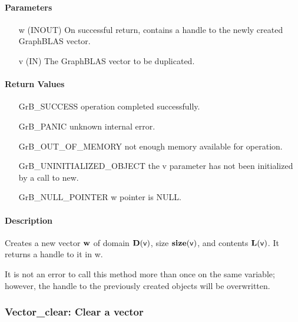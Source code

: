 \paragraph{Parameters}

\begin{itemize}[leftmargin=1.1in]
    \item[{\sf w}]  ({\sf INOUT}) On successful return, contains a handle
                                  to the newly created GraphBLAS vector.
    \item[{\sf v}]  ({\sf IN})    The GraphBLAS vector to be duplicated.
\end{itemize}

\paragraph{Return Values}

\begin{itemize}[leftmargin=2.1in]
\item[{\sf GrB\_SUCCESS}]    operation completed successfully.
\item[{\sf GrB\_PANIC}]      unknown internal error.
\item[{\sf GrB\_OUT\_OF\_MEMORY}]   not enough memory available for operation.
\item[{\sf GrB\_UNINITIALIZED\_OBJECT}]   the {\sf v} parameter has not been initialized
                             by a call to {\sf new}.
\item[{\sf GrB\_NULL\_POINTER}]    {\sf w} pointer is {\sf NULL}.
\end{itemize}

\paragraph{Description}

Creates a new vector ${\bf w}$ of domain $\bold{D}({\sf v})$, size 
$\bold{size}({\sf v})$, and contents $\bold{L}({\sf v})$. It returns a 
handle to it in {\sf w}.

It is not an error to call this method more than once on the same variable;  
however, the handle to the previously created objects will be overwritten. 

\subsubsection{{\sf Vector\_clear}: Clear a vector}

